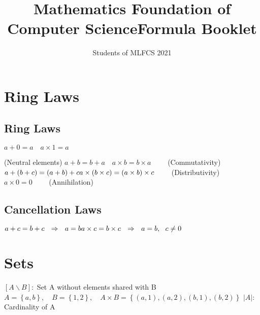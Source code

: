 \documentclass[12pt]{article}
\title{Mathematics Foundation of Computer Science\newline Formula Booklet}
\author{Students of MLFCS 2021}
\begin{document}
\maketitle
\newpage
\tableofcontents
\newpage
\section{Ring Laws}
\subsection{Ring Laws}
\begin{math}a+0=a\quad a\times1=a\quad\quad\end{math} \raggedright (Neutral elements)\newline\newline
\begin{math}a+b=b+a\quad a\times b=b\times a\quad\quad\end{math} (Commutativity)\newline\newline
\begin{math}a+(b+c)=(a+b)+c\quad \newline a\times (b\times c)=(a\times b)\times c\quad\quad \end{math}
(Distributivity)\newline\newline
\begin{math}a\times 0 = 0\quad\quad\end{math} (Annihilation)\newline\newline
\subsection{Cancellation Laws}
\begin{math}a+c=b+c\ \ \Rightarrow\ \ a=b\newline\newline
a\times c = b\times c\ \ \Rightarrow\ \ a=b,\ \ c\neq 0\end{math}\newpage
\section{Sets}
\begin{math}\left [ A\backslash B\right ]:\end{math} Set A without elements shared with B\newline
\newline
\begin{math}
A=\left \{ a,b \right \},\quad B=\left \{ 1,2 \right \},\quad A\times B=\left \{ \left ( a,1 \right ),\left ( a,2 \right ),\left ( b,1 \right ),\left ( b,2 \right )  \right \}
\end{math}\newline\newline
\begin{math}\left | A \right |:\end{math} Cardinality of A\newpage
\end{document}
